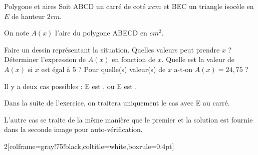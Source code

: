 \vspace{-1mm}
\def\rdifficulty{2.5}
\begin{EXO}{Polygone et aires}{}
Soit ABCD un carré de coté $x cm$ et BEC un triangle isocèle en $E$ de hauteur $2 cm$.

On note $A(x)$ l'aire du polygone ABECD en $cm^2$.
\begin{tcbenumerate}[2]
\tcbitem {} Faire un dessin représentant la situation.
\tcbitem {} Quelles valeurs peut prendre $x$ ?
\tcbitem {} Déterminer l'expression de $A(x)$ en fonction de $x$.
\tcbitem {} Quelle est la valeur de $A(x)$ si $x$ est égal à $5$ ?
\tcbitem[raster multicolumn=2]   Pour quelle(s) valeur(s) de $x$ a-t-on $A(x)=24,75$ ?
\end{tcbenumerate}

\exocorrection

\begin{tcbenumerate}[1]
    \tcbitem Il y a deux cas possibles : E est , ou E est .
    
    \bcattention Dans la suite de l'exercice, on traitera uniquement le cas avec E  au carré. 

    L'autre cas se traite de la même manière que le premier et la solution est fournie dans la seconde image pour auto-vérification.

    \begin{MultiColonnes}{2}[colframe=gray!75!black,coltitle=white,boxrule=0.4pt]
\tcbitem[halign=center,valign=center,title=Le cas avec E extérieur :]


\end{MultiColonnes}
\end{tcbenumerate}
\end{EXO}

